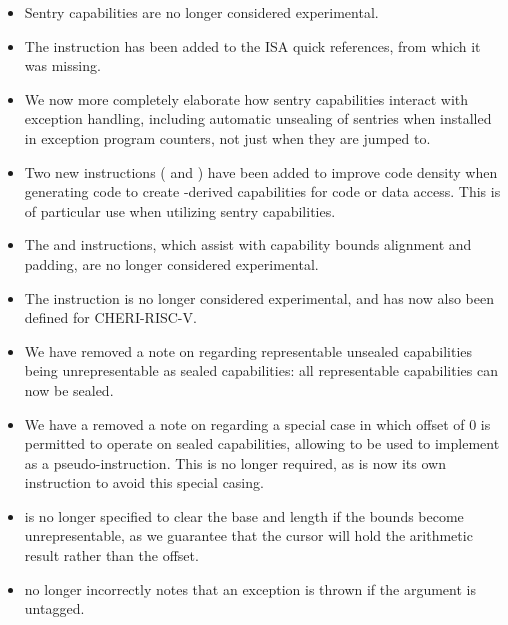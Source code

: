 \begin{itemize}
\item Sentry capabilities are no longer considered experimental.

\item The instruction  has been added to the ISA quick
  references, from which it was missing.

\item We now more completely elaborate how sentry capabilities interact with
  exception handling, including automatic unsealing of sentries when installed
  in exception program counters, not just when they are jumped to.

\item Two new instructions ( and
  ) have been added to improve code density when
  generating code to create \PCC{}-derived capabilities for code or data
  access.
  This is of particular use when utilizing sentry capabilities.

\item The  and  instructions, which assist with
  capability bounds alignment and padding, are no longer considered
  experimental.

\item The  instruction is no longer considered
  experimental, and has now also been defined for CHERI-RISC-V.

\item We have removed a note on 
  regarding representable unsealed capabilities being unrepresentable as
  sealed capabilities: all representable capabilities can now be sealed.

\item We have a removed a note on  regarding a special
  case in which offset of 0 is permitted to operate on sealed capabilities,
  allowing  to be used to implement
   as a pseudo-instruction.
  This is no longer required, as  is now its own
  instruction to avoid this special casing.

\item {} is no longer specified to clear the base and
  length if the bounds become unrepresentable, as we guarantee that the cursor
  will hold the arithmetic result rather than the offset.

\item {} no longer incorrectly notes that an exception
  is thrown if the argument is untagged.


\end{itemize}
